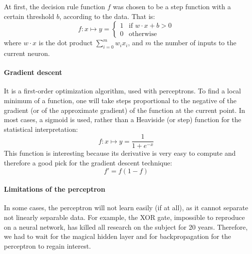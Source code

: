 At first, the decision rule function $f$ was chosen to be a step function with a certain threshold $b$, according to the data. That is:
\begin{equation*}
    f : x \mapsto y  = \begin{cases}1 & \text{if }w \cdot x + b > 0\\0 & \text{otherwise}\end{cases}
\end{equation*}
where $w \cdot x$ is the dot product $\sum_{i=0}^m w_i x_i$, and $m$ the number of inputs to the current neuron.
\paragraph{Gradient descent} It is a first-order optimization algorithm, used with perceptrons. To find a local minimum of a function, one will take steps proportional to the negative of the gradient (or of the approximate gradient) of the function at the current point. In most cases, a sigmoid is used, rather than a Heaviside (or step) function for the statistical interpretation:
\begin{equation*}
    f : x \mapsto y = \frac{1}{1 + e^{- x}}    
\end{equation*}
This function is interesting because its derivative is very easy to compute and therefore a good pick for the gradient descent technique:
\begin{equation*}
    f'=f(1-f)
\end{equation*}

\paragraph{Limitations of the perceptron} In some cases, the perceptron will not learn easily (if at all), as it cannot separate not linearly separable data. For example, the XOR gate, impossible to reproduce on a neural network, has killed all research on the subject for 20 years. Therefore, we had to wait for the magical hidden layer and for backpropagation for the perceptron to regain interest.

